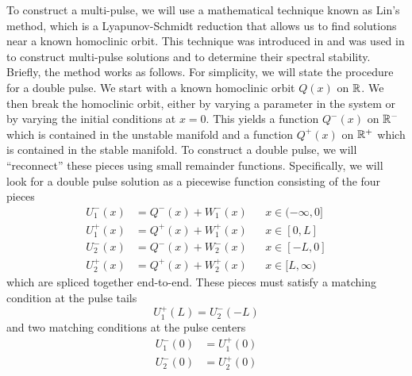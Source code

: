 \documentclass[thesis.tex]{subfiles}
\begin{document}
To construct a multi-pulse, we will use a mathematical technique known as Lin's method, which is a Lyapunov-Schmidt reduction that allows us to find solutions near a known homoclinic orbit. This technique was introduced in \cite{Lin1990} and was used in \cite{Sandstede1993,SandstedeStrut} to construct multi-pulse solutions and \cite{Sandstede1998} to determine their spectral stability. Briefly, the method works as follows. For simplicity, we will state the procedure for a double pulse. We start with a known homoclinic orbit $Q(x)$ on $\mathbb{R}$. We then break the homoclinic orbit, either by varying a parameter in the system or by varying the initial conditions at $x = 0$. This yields a function $Q^-(x)$ on $\mathbb{R}^-$ which is contained in the unstable manifold and a function $Q^+(x)$ on $\mathbb{R}^+$ which is contained in the stable manifold. To construct a double pulse, we will ``reconnect'' these pieces using small remainder functions. Specifically, we will look for a double pulse solution as a piecewise function consisting of the four pieces
\begin{align*}
U_1^-(x) &= Q^-(x) + W_1^-(x) && x \in (-\infty, 0] \\
U_1^+(x) &= Q^+(x) + W_1^+(x) && x \in [0, L] \\
U_2^-(x) &= Q^-(x) + W_2^-(x) && x \in [-L, 0] \\
U_2^+(x) &= Q^+(x) + W_2^+(x) && x \in [L, \infty)
\end{align*}
which are spliced together end-to-end. These pieces must satisfy a matching condition at the pulse tails
\begin{equation}\label{introLin1}
U_1^+(L) = U_2^-(-L)
\end{equation} 
and two matching conditions at the pulse centers
\begin{equation}\label{introLin2}
\begin{aligned}
U_1^-(0) &= U_1^+(0) \\
U_2^-(0) &= U_2^+(0)
\end{aligned}
\end{equation} 
\end{document}
